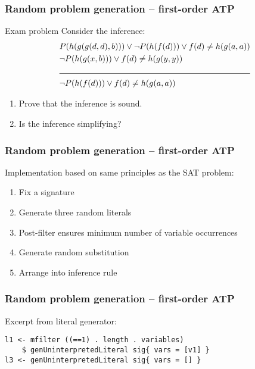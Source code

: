 \documentclass[xcolor={table}]{beamer}
\begin{document}

\begin{frame}
    \frametitle{Random problem generation -- first-order ATP}

    \begin{block}{Exam problem}
        Consider the inference:
        \begin{align*}
            & P(h(g(g(d,d),b))) \lor \lnot P(h(f(d))) \lor f(d) \neq h(g(a,a)) \\
            & \lnot P(h(g(x,b))) \lor f(d) \neq h(g(y,y)) \\
            \cline{1-2}
            & \lnot P(h(f(d))) \lor f(d) \neq h(g(a,a))
        \end{align*}
        \vspace*{-1.5em}
        \begin{enumerate}
            \item Prove that the inference is sound.
            \item Is the inference simplifying?
        \end{enumerate}
    \end{block}
\end{frame}

\begin{frame}
    \frametitle{Random problem generation -- first-order ATP}

    Implementation based on same principles as the SAT problem:
    \begin{enumerate}
        \item Fix a signature
        \item Generate three random literals
        \item Post-filter ensures minimum number of variable occurrences
        \item Generate random substitution
        \item Arrange into inference rule
    \end{enumerate}
\end{frame}

\begin{frame}[fragile]
    \frametitle{Random problem generation -- first-order ATP}

    Excerpt from literal generator:

\begin{lstlisting}
l1 <- mfilter ((==1) . length . variables)
    $ genUninterpretedLiteral sig{ vars = [v1] }
l3 <- genUninterpretedLiteral sig{ vars = [] }
\end{lstlisting}
\end{frame}
\end{document}

